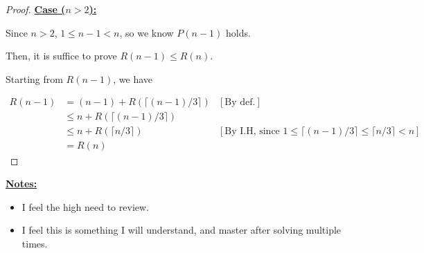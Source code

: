 \documentclass[12pt]{article}
\begin{document}
\begin{enumerate}[a.]
\begin{proof}
        \bigskip

        \underline{\textbf{Case ($n > 2$):}}

        \bigskip

        Since $n > 2$, $1 \leq n - 1 < n$, so we know $P(n-1)$ holds.

        \bigskip

        Then, it is suffice to prove $R(n-1) \leq R(n)$.

        \bigskip

        Starting from $R(n-1)$, we have

        \begin{align}
            R(n-1) &= (n-1) + R(\lceil (n-1)/3 \rceil) & [\text{By def.}]\\
            &\leq n + R(\lceil (n-1)/3 \rceil) \\
            &\leq n + R(\lceil n/3 \rceil) & [\text{By I.H, since $1 \leq \lceil (n-1)/3 \rceil \leq \lceil n/3 \rceil < n$}]\\
            &= R(n)
        \end{align}
    \end{proof}

    \bigskip

    \underline{\textbf{Notes:}}

    \bigskip

    \begin{itemize}
        \item I feel the high need to review.
        \item I feel this is something I will understand, and master after solving
        multiple times.
    \end{itemize}











\end{enumerate}
\end{document}
